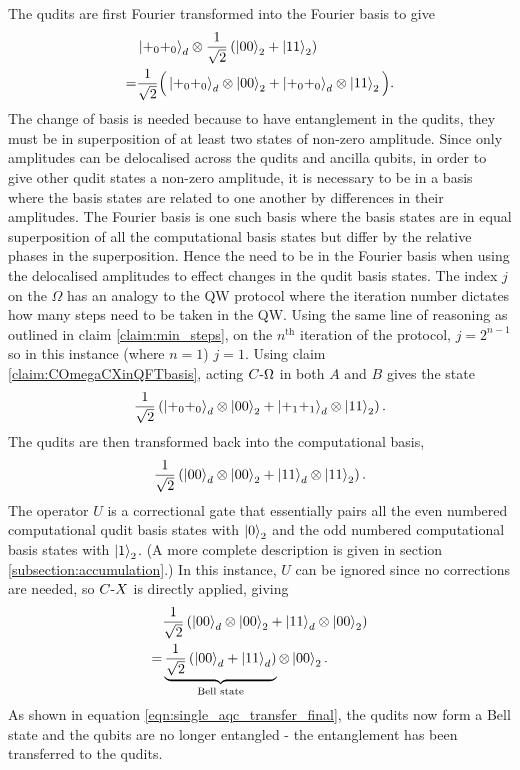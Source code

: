 The qudits are first Fourier transformed into the Fourier basis to give
\begin{align}
    &\ket{+_0 +_0}_d\otimes\frac{1}{\sqrt{2}}\left(\ket{00}_2 + \ket{11}_2\right)\\
    =&\frac{1}{\sqrt{2}}\Big(
        \ket{+_0 +_0}_d \otimes \ket{00}_2
        +\ket{+_0 +_0}_d \otimes \ket{11}_2
        \Big).
\end{align}
The change of basis is needed because to have entanglement in the qudits, they must be in superposition of at least two states of non-zero amplitude.
Since only amplitudes can be delocalised across the qudits and ancilla qubits, in order to give other qudit states a non-zero amplitude, it is necessary to be in a basis where the basis states are related to one another by differences in their amplitudes.
The Fourier basis is one such basis where the basis states are in equal superposition of all the computational basis states but differ by the relative phases in the superposition.
Hence the need to be in the Fourier basis when using the delocalised amplitudes to effect changes in the qudit basis states.
The index $j$ on the $\Omega$ has an analogy to the QW protocol where the iteration number dictates how many steps need to be taken in the QW.
Using the same line of reasoning as outlined in claim \ref{claim:min_steps}, on the $n^{\text{th}}$ iteration of the protocol, $j = 2^{n-1}$ so in this instance (where $n=1$) $j=1$.
Using claim \ref{claim:COmegaCXinQFTbasis}, acting $C\text{-}\Omega$ in both $A$ and $B$ gives the state
\begin{equation}
    \frac{1}{\sqrt{2}}\left(
        \ket{+_0 +_0}_d \otimes \ket{00}_2
        +\ket{+_1 +_1}_d \otimes \ket{11}_2
        \right).
\end{equation}
The qudits are then transformed back into the computational basis,
\begin{equation}
    \frac{1}{\sqrt{2}}\left(
        \ket{0 0}_d \otimes \ket{00}_2
        +\ket{1 1}_d \otimes \ket{11}_2
        \right).
\end{equation}
The operator $U$ is a correctional gate that essentially pairs all the even numbered computational qudit basis states with $\ket{0}_2$ and the odd numbered computational basis states with $\ket{1}_2$.
(A more complete description is given in section \ref{subsection:accumulation}.)
In this instance, $U$ can be ignored since no corrections are needed, so $C\text{-}X$ is directly applied, giving
\begin{align}
    &\frac{1}{\sqrt{2}}\left(
        \ket{00}_d \otimes \ket{00}_2
        +\ket{11}_d \otimes \ket{00}_2
        \right)\\
    =&\underbrace{
        \frac{1}{\sqrt{2}}\left(\ket{00}_d +\ket{11}_d\right)
    }_{\text{Bell state}}
    \otimes \ket{00}_2.    
    \label{eqn:single_aqc_transfer_final}
\end{align}
As shown in equation \ref{eqn:single_aqc_transfer_final}, the qudits now form a Bell state and the qubits are no longer entangled - the entanglement has been transferred to the qudits.

